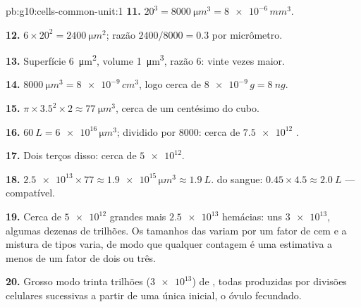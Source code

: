 \begin{solution}{pb:g10:cells-common-unit:1}
\textbf{11.} $20^3 = \qty{8000}{\micro m^3} = \num{8e-6}\,\unit{mm^3}$.

\textbf{12.} $6 \times 20^2 = \qty{2400}{\micro m^2}$; razão
$2400/8000 = 0.3$ por micrômetro.

\textbf{13.} Superfície \qty{6}{\micro m^2}, volume \qty{1}{\micro m^3},
razão 6: vinte vezes maior.

\textbf{14.} $\qty{8000}{\micro m^3} = \num{8e-9}\,\unit{cm^3}$, logo
cerca de $\num{8e-9}\,\unit{g} = \qty{8}{ng}$.

\textbf{15.} $\pi \times 3.5^2 \times 2 \approx \qty{77}{\micro m^3}$,
cerca de um centésimo do cubo.

\textbf{16.} $\qty{60}{L} = \num{6e16}\,\unit{\micro m^3}$; dividido por
8000: cerca de $\num{7.5e12}$ .

\textbf{17.} Dois terços disso: cerca de $\num{5e12}$.

\textbf{18.} $\num{2.5e13} \times 77 \approx \num{1.9e15}\,\unit{\micro
m^3} \approx \qty{1.9}{L}$.  do sangue: $0.45 \times 4.5 \approx
\qty{2.0}{L}$ --- compatível.

\textbf{19.} Cerca de $\num{5e12}$  grandes mais $\num{2.5e13}$
hemácias: uns $\num{3e13}$, algumas dezenas de trilhões. Os tamanhos das
 variam por um fator de cem e a mistura de tipos varia, de modo
que qualquer contagem é uma estimativa a menos de um fator de dois ou três.

\textbf{20.} Grosso modo trinta trilhões ($\num{3e13}$) de ,
todas produzidas por divisões celulares sucessivas a partir de uma
única  inicial, o óvulo fecundado.
\end{solution}
